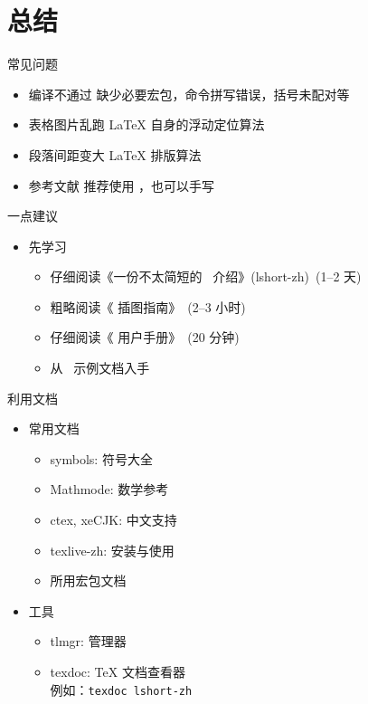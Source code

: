 \section{总结}

\begin{frame}{常见问题}
  \begin{itemize}
  \item \alert{编译不通过} 缺少必要宏包，命令拼写错误，括号未配对等
  \item \alert{表格图片乱跑} \LaTeX{} 自身的浮动定位算法
  \item \alert{段落间距变大} \LaTeX{} 排版算法
  \item \alert{参考文献} 推荐使用 \BibTeX{}，也可以手写 
  \end{itemize}
\end{frame}

\begin{frame}{一点建议}
  \begin{itemize}
    \item 先学习
      \begin{itemize}
        \item 仔细阅读《一份不太简短的~\LaTeXe{} 介绍》(lshort-zh)~(1--2 天)
        \item 粗略阅读《\LaTeXe{} 插图指南》~(2--3 小时)
        \item 仔细阅读《\ThuThesis{} 用户手册》~(20 分钟)
        \item 从~\ThuThesis{} 示例文档入手
      \end{itemize}
  \end{itemize}
\end{frame}

\begin{frame}{利用文档}
  \begin{itemize}
    \item 常用文档
      \begin{itemize}
        \item symbols: 符号大全
        \item Mathmode: 数学参考
        \item ctex, xeCJK: 中文支持
        \item texlive-zh: \TL 安装与使用
        \item 所用宏包文档
      \end{itemize}
    \item 工具
      \begin{itemize}
        \item tlmgr: \TL 管理器
        \item texdoc: \TeX{} 文档查看器\\
          例如：\texttt{texdoc lshort-zh}
      \end{itemize}
  \end{itemize}
\end{frame}

